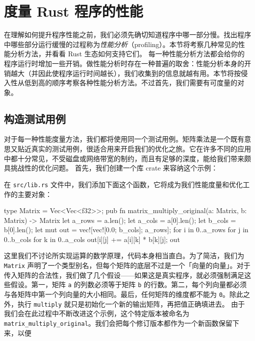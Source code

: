 \section{度量 Rust 程序的性能}
\label{idx:idx_bc9f66b1}
在理解如何提升程序性能之前，我们必须先确切知道程序中哪一部分慢。找出程序中哪些部分运行缓慢的过程称为\emph{性能分析}（profiling）。本节将考察几种常见的性能分析方法，并看看 Rust 生态如何支持它们。
\label{idx:idx_b09838c2}
每一种性能分析方法都会给你的程序运行时增加一些开销。做性能分析时存在一种普遍的取舍：性能分析本身的开销越大（并因此使程序运行时间越长），我们收集到的信息就越有用。本节将按侵入性从低到高的顺序考察各种性能分析方法。不过首先，我们需要有可度量的对象。
\subsection{构造测试用例}
\label{idx:idx_846f5fb1}
对于每一种性能度量方法，我们都将使用同一个测试用例。矩阵乘法是一个既有意思又贴近真实的测试用例，很适合用来开启我们的优化之旅。它在许多不同的应用中都十分常见，不受磁盘或网络带宽的制约，而且有足够的深度，能给我们带来颇具挑战性的优化问题。
首先，我们创建一个库 crate 来容纳这个示例：
在 \texttt{src/lib.rs} 文件中，我们添加下面这个函数，它将成为我们性能度量和优化工作的主要对象：
\begin{codebox}[rust]
type Matrix = Vec<Vec<f32>>;
 pub fn matrix_multiply_original(a: Matrix, b: Matrix) -> Matrix {
     let a_rows = a.len();
     let a_cols = a[0].len();
     let b_cols = b[0].len();
     let mut out = vec![vec![0.0; b_cols]; a_rows];
     for i in 0..a_rows {
         for j in 0..b_cols {
             for k in 0..a_cols {
                 out[i][j] += a[i][k] * b[k][j];
             }
         }
     }
     out
 }
\end{codebox}
这里我们不讨论所实现运算的数学原理，代码本身相当直白。为了简洁，我们为 \texttt{Matrix} 声明了一个类型别名，但每个矩阵的底层不过是一个「向量的向量」。对于传入矩阵的合法性，我们做了几个假设——如果这是真实程序，就必须强制满足这些假设。第一，矩阵 \texttt{a} 的列数必须等于矩阵 \texttt{b} 的行数。第二，每个列向量都必须与各矩阵中第一个列向量的大小相同。最后，任何矩阵的维度都不能为 \texttt{0}。除此之外，执行 \texttt{multiply} 就只是初始化一个新的输出矩阵，再把值正确填进去。
由于我们会在此过程中不断改进这个示例，这个特定版本被命名为
\texttt{matrix\_\allowbreak{}multiply\_\allowbreak{}original}。我们会把每个修订版本都作为一个新函数保留下来，以便
